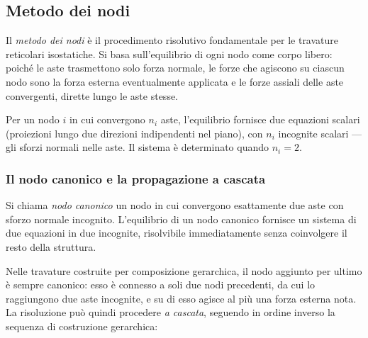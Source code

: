\subsection{Metodo dei nodi}
\label{sec:metodo_nodi}

Il \emph{metodo dei nodi} è il procedimento risolutivo
fondamentale per le travature reticolari isostatiche.
Si basa sull'equilibrio di ogni nodo come corpo libero:
poiché le aste trasmettono solo forza normale, le forze
che agiscono su ciascun nodo sono la forza esterna
eventualmente applicata e le forze assiali delle aste
convergenti, dirette lungo le aste stesse.

Per un nodo $i$ in cui convergono $n_i$ aste, l'equilibrio
fornisce due equazioni scalari (proiezioni lungo due
direzioni indipendenti nel piano), con $n_i$ incognite
scalari --- gli sforzi normali nelle aste. Il sistema
è determinato quando $n_i = 2$.


\subsubsection{Il nodo canonico e la propagazione a cascata}

Si chiama \emph{nodo canonico} un nodo in cui
convergono esattamente due aste con sforzo normale
incognito. L'equilibrio di un nodo canonico fornisce
un sistema di due equazioni in due incognite,
risolvibile immediatamente senza coinvolgere
il resto della struttura.

Nelle travature costruite per composizione gerarchica,
il nodo aggiunto per ultimo è sempre canonico: esso
è connesso a soli due nodi precedenti, da cui lo
raggiungono due aste incognite, e su di esso agisce
al più una forza esterna nota. La risoluzione può
quindi procedere \emph{a cascata}, seguendo in ordine
inverso la sequenza di costruzione gerarchica:

